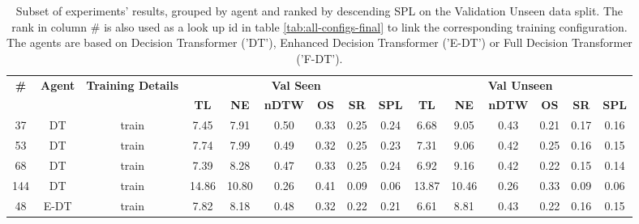 \begin{table}
\centering
\caption{\label{tab:reward_scale}Subset of experiments' results, grouped by agent and ranked by descending SPL on the Validation Unseen data split. The rank in column \# is also used as a look up id in table \ref{tab:all-configs-final} to link the corresponding training configuration.     \newline The agents are based on Decision Transformer ('DT'), Enhanced Decision Transformer ('E-DT') or Full Decision Transformer ('F-DT').}
\begin{tabular}{@{\hskip3pt}c@{\hskip3pt}c@{\hskip3pt}c@{\hskip3pt}c@{\hskip3pt}c@{\hskip3pt}c@{\hskip3pt}c@{\hskip3pt}c@{\hskip3pt}c@{\hskip3pt}c@{\hskip3pt}c@{\hskip3pt}c@{\hskip3pt}c@{\hskip3pt}c@{\hskip3pt}c}
\toprule
\textbf{\#} & \textbf{Agent} & \textbf{Training Details} & \multicolumn{6}{c}{\textbf{Val Seen}} & \multicolumn{6}{c}{\textbf{Val Unseen}} \\
 \textbf{~} &     \textbf{~} &                \textbf{~} &       \textbf{TL} & \textbf{NE} & \textbf{nDTW} & \textbf{OS} & \textbf{SR} & \textbf{SPL} &         \textbf{TL} & \textbf{NE} & \textbf{nDTW} & \textbf{OS} & \textbf{SR} & \textbf{SPL} \\
\midrule
         37 &             DT &                     train &              7.45 &        7.91 &          0.50 &        0.33 &        0.25 &         0.24 &                6.68 &        9.05 &          0.43 &        0.21 &        0.17 &         0.16 \\
         53 &             DT &                     train &              7.74 &        7.99 &          0.49 &        0.32 &        0.25 &         0.23 &                7.31 &        9.06 &          0.42 &        0.25 &        0.16 &         0.15 \\
         68 &             DT &                     train &              7.39 &        8.28 &          0.47 &        0.33 &        0.25 &         0.24 &                6.92 &        9.16 &          0.42 &        0.22 &        0.15 &         0.14 \\
        144 &             DT &                     train &             14.86 &       10.80 &          0.26 &        0.41 &        0.09 &         0.06 &               13.87 &       10.46 &          0.26 &        0.33 &        0.09 &         0.06 \\
         48 &           E-DT &                     train &              7.82 &        8.18 &          0.48 &        0.32 &        0.22 &         0.21 &                6.61 &        8.81 &          0.43 &        0.22 &        0.16 &         0.15 \\

\end{tabular}
\end{table}
